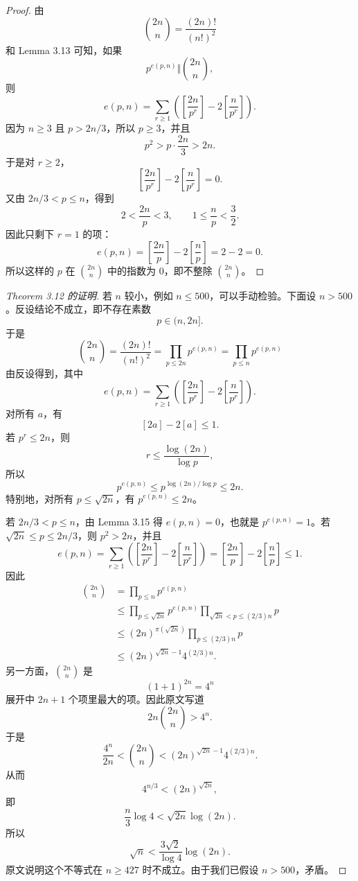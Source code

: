 \begin{proof}
	由
	\[
		\binom{2n}{n}=\frac{(2n)!}{(n!)^2}
	\]
	和 Lemma 3.13 可知，如果
	\[
		p^{e(p,n)}\Vert \binom{2n}{n},
	\]
	则
	\[
		e(p,n)=\sum_{r\geq 1}\left(\left[\frac{2n}{p^r}\right]-2\left[\frac n{p^r}\right]\right).
	\]
	因为 $n\geq 3$ 且 $p>2n/3$，所以 $p\geq 3$，并且
	\[
		p^2>p\cdot \frac{2n}{3}>2n.
	\]
	于是对 $r\geq 2$，
	\[
		\left[\frac{2n}{p^r}\right]-2\left[\frac n{p^r}\right]=0.
	\]
	又由 $2n/3<p\leq n$，得到
	\[
		2<\frac{2n}{p}<3,
		\qquad
		1\leq \frac np<\frac32.
	\]
	因此只剩下 $r=1$ 的项：
	\[
		e(p,n)
		=
		\left[\frac{2n}{p}\right]
		-
		2\left[\frac np\right]
		=
		2-2=0.
	\]
	所以这样的 $p$ 在 $\binom{2n}{n}$ 中的指数为 $0$，即不整除 $\binom{2n}{n}$。
\end{proof}

\begin{proof}[Theorem 3.12 的证明]
	若 $n$ 较小，例如 $n\leq 500$，可以手动检验。下面设 $n>500$。反设结论不成立，即不存在素数
	\[
		p\in(n,2n].
	\]
	于是
	\[
		\binom{2n}{n}
		=
		\frac{(2n)!}{(n!)^2}
		=
		\prod_{p\leq 2n}p^{e(p,n)}
		=
		\prod_{p\leq n}p^{e(p,n)}
	\]
	由反设得到，其中
	\[
		e(p,n)=\sum_{r\geq 1}\left(\left[\frac{2n}{p^r}\right]-2\left[\frac n{p^r}\right]\right).
	\]
	对所有 $a$，有
	\[
		[2a]-2[a]\leq 1.
	\]
	若 $p^r\leq 2n$，则
	\[
		r\leq \frac{\log(2n)}{\log p},
	\]
	所以
	\[
		p^{e(p,n)}
		\leq
		p^{\log(2n)/\log p}
		\leq
		2n.
	\]
	特别地，对所有 $p\leq \sqrt{2n}$，有 $p^{e(p,n)}\leq 2n$。

	若 $2n/3<p\leq n$，由 Lemma 3.15 得 $e(p,n)=0$，也就是 $p^{e(p,n)}=1$。若 $\sqrt{2n}\leq p\leq 2n/3$，则 $p^2>2n$，并且
	\[
		e(p,n)
		=
		\sum_{r\geq 1}\left(\left[\frac{2n}{p^r}\right]-2\left[\frac n{p^r}\right]\right)
		=
		\left[\frac{2n}{p}\right]-2\left[\frac np\right]
		\leq 1.
	\]
	因此
	\[
	\begin{aligned}
		\binom{2n}{n}
		&=
		\prod_{p\leq n}p^{e(p,n)}\\
		&\leq
		\prod_{p\leq \sqrt{2n}}p^{e(p,n)}
		\prod_{\sqrt{2n}<p\leq (2/3)n}p\\
		&\leq
		(2n)^{\pi(\sqrt{2n})}
		\prod_{p\leq (2/3)n}p\\
		&\leq
		(2n)^{\sqrt{2n}-1}4^{(2/3)n}.
	\end{aligned}
	\]
	另一方面，$\binom{2n}{n}$ 是
	\[
		(1+1)^{2n}=4^n
	\]
	展开中 $2n+1$ 个项里最大的项。因此原文写道
	\[
		2n\binom{2n}{n}>4^n.
	\]
	于是
	\[
		\frac{4^n}{2n}
		<
		\binom{2n}{n}
		<
		(2n)^{\sqrt{2n}-1}4^{(2/3)n}.
	\]
	从而
	\[
		4^{n/3}<(2n)^{\sqrt{2n}},
	\]
	即
	\[
		\frac n3\log 4<\sqrt{2n}\log(2n).
	\]
	所以
	\[
		\sqrt n<\frac{3\sqrt2}{\log 4}\log(2n).
	\]
	原文说明这个不等式在 $n\geq 427$ 时不成立。由于我们已假设 $n>500$，矛盾。
\end{proof}

